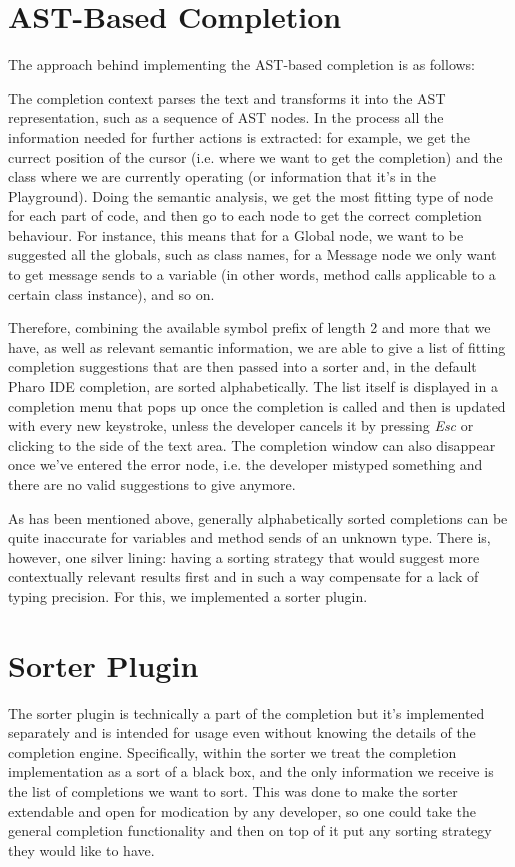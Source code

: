 \section{AST-Based Completion}
The approach behind implementing the AST-based completion is as follows:

The completion context parses the text and transforms it into the AST representation, such as a sequence of AST nodes. In the process all the information needed for further actions is extracted: for example, we get the currect position of the cursor (i.e. where we want to get the completion) and the class where we are currently operating (or information that it's in the Playground). Doing the semantic analysis, we get the most fitting type of node for each part of code, and then go to each node to get the correct completion behaviour. For instance, this means that for a Global node, we want to be suggested all the globals, such as class names, for a Message node we only want to get message sends to a variable (in other words, method calls applicable to a certain class instance), and so on.

Therefore, combining the available symbol prefix of length 2 and more that we have, as well as relevant semantic information, we are able to give a list of fitting completion suggestions that are then passed into a sorter and, in the default Pharo IDE completion, are sorted alphabetically. The list itself is displayed in a completion menu that pops up once the completion is called and then is updated with every new keystroke, unless the developer cancels it by pressing \textit{Esc} or clicking to the side of the text area. The completion window can also disappear once we've entered the error node, i.e. the developer mistyped something and there are no valid suggestions to give anymore.

As has been mentioned above, generally alphabetically sorted completions can be quite inaccurate for variables and method sends of an unknown type. There is, however, one silver lining: having a sorting strategy that would suggest more contextually relevant results first and in such a way compensate for a lack of typing precision. For this, we implemented a sorter plugin.

\section{Sorter Plugin}
The sorter plugin is technically a part of the completion but it's implemented separately and is intended for usage even without knowing the details of the completion engine. Specifically, within the sorter we treat the completion implementation as a sort of a black box, and the only information we receive is the list of completions we want to sort. This was done to make the sorter extendable and open for modication by any developer, so one could take the general completion functionality and then on top of it put any sorting strategy they would like to have.

